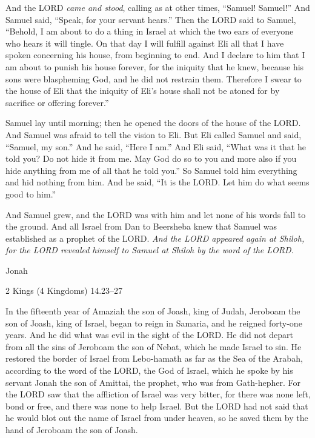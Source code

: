 \documentclass[
]{article}
\newcommand{\RL}[1]{\beginR #1\endR}
\begin{document}
And the LORD \emph{came and stood}, calling as at other times,
\RL{``}Samuel! Samuel!'' And Samuel said, \RL{``}Speak, for your servant
hears.'' Then the LORD said to Samuel, \RL{``}Behold, I am about to do a
thing in Israel at which the two ears of everyone who hears it will
tingle. On that day I will fulfill against Eli all that I have spoken
concerning his house, from beginning to end. And I declare to him that I
am about to punish his house forever, for the iniquity that he knew,
because his sons were blaspheming God, and he did not restrain them.
Therefore I swear to the house of Eli that the iniquity of Eli\RL{'}s
house shall not be atoned for by sacrifice or offering forever.''

Samuel lay until morning; then he opened the doors of the house of the
LORD. And Samuel was afraid to tell the vision to Eli. But Eli called
Samuel and said, \RL{``}Samuel, my son.'' And he said, \RL{``}Here I
am.'' And Eli said, \RL{``}What was it that he told you? Do not hide it
from me. May God do so to you and more also if you hide anything from me
of all that he told you.'' So Samuel told him everything and hid nothing
from him. And he said, \RL{``}It is the LORD. Let him do what seems good
to him.''

And Samuel grew, and the LORD was with him and let none of his words
fall to the ground. And all Israel from Dan to Beersheba knew that
Samuel was established as a prophet of the LORD. \emph{And the LORD
appeared again at Shiloh, for the LORD revealed himself to Samuel at
Shiloh by the word of the LORD.}

Jonah

2 Kings (4 Kingdoms) 14.23--27

In the fifteenth year of Amaziah the son of Joash, king of Judah,
Jeroboam the son of Joash, king of Israel, began to reign in Samaria,
and he reigned forty-one years. And he did what was evil in the sight of
the LORD. He did not depart from all the sins of Jeroboam the son of
Nebat, which he made Israel to sin. He restored the border of Israel
from Lebo-hamath as far as the Sea of the Arabah, according to the word
of the LORD, the God of Israel, which he spoke by his servant Jonah the
son of Amittai, the prophet, who was from Gath-hepher. For the LORD saw
that the affliction of Israel was very bitter, for there was none left,
bond or free, and there was none to help Israel. But the LORD had not
said that he would blot out the name of Israel from under heaven, so he
saved them by the hand of Jeroboam the son of Joash.
\end{document}

